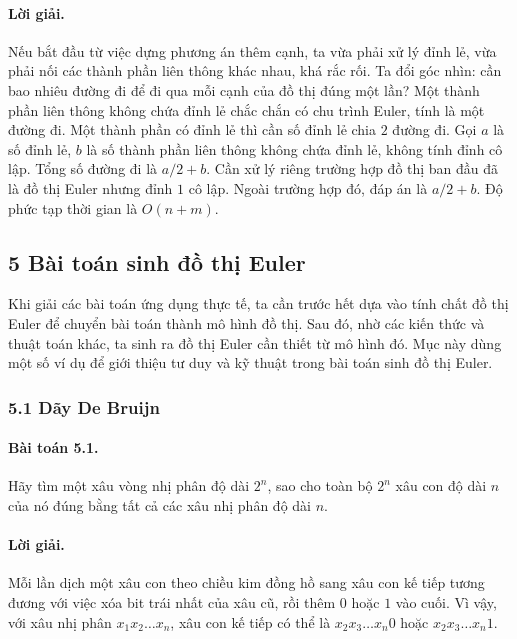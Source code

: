 \documentclass[11pt]{article}
\begin{document}
\paragraph{Lời giải.}
Nếu bắt đầu từ việc dựng phương án thêm cạnh, ta vừa phải xử lý đỉnh lẻ, vừa
phải nối các thành phần liên thông khác nhau, khá rắc rối. Ta đổi góc nhìn:
cần bao nhiêu đường đi để đi qua mỗi cạnh của đồ thị đúng một lần? Một thành
phần liên thông không chứa đỉnh lẻ chắc chắn có chu trình Euler, tính là một
đường đi. Một thành phần có đỉnh lẻ thì cần số đỉnh lẻ chia \(2\) đường đi. Gọi
\(a\) là số đỉnh lẻ, \(b\) là số thành phần liên thông không chứa đỉnh lẻ, không
tính đỉnh cô lập. Tổng số đường đi là \(a/2+b\). Cần xử lý riêng trường hợp đồ
thị ban đầu đã là đồ thị Euler nhưng đỉnh \(1\) cô lập. Ngoài trường hợp đó,
đáp án là \(a/2+b\). Độ phức tạp thời gian là \(O(n+m)\).

\subsection*{5 Bài toán sinh đồ thị Euler}

Khi giải các bài toán ứng dụng thực tế, ta cần trước hết dựa vào tính chất đồ
thị Euler để chuyển bài toán thành mô hình đồ thị. Sau đó, nhờ các kiến thức và
thuật toán khác, ta sinh ra đồ thị Euler cần thiết từ mô hình đó. Mục này dùng
một số ví dụ để giới thiệu tư duy và kỹ thuật trong bài toán sinh đồ thị Euler.

\subsubsection*{5.1 Dãy De Bruijn}

\paragraph{Bài toán 5.1.}
Hãy tìm một xâu vòng nhị phân độ dài \(2^n\), sao cho toàn bộ \(2^n\) xâu con
độ dài \(n\) của nó đúng bằng tất cả các xâu nhị phân độ dài \(n\).

\paragraph{Lời giải.}
Mỗi lần dịch một xâu con theo chiều kim đồng hồ sang xâu con kế tiếp tương
đương với việc xóa bit trái nhất của xâu cũ, rồi thêm \(0\) hoặc \(1\) vào
cuối. Vì vậy, với xâu nhị phân \(x_1x_2\ldots x_n\), xâu con kế tiếp có thể là
\(x_2x_3\ldots x_n0\) hoặc \(x_2x_3\ldots x_n1\).
\end{document}
